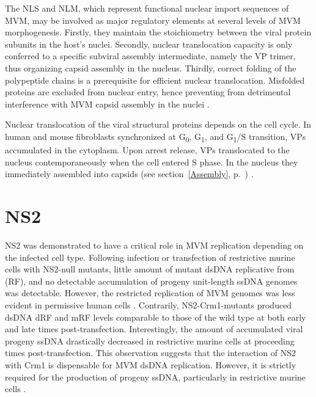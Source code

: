 The NLS and NLM, which represent functional nuclear import sequences of MVM, may be involved as major regulatory elements at several levels of MVM morphogenesis. Firstly, they maintain the stoichiometry between the viral protein subunits in the host's nuclei. Secondly, nuclear translocation capacity is only conferred to a specific subviral assembly intermediate, namely the VP trimer, thus organizing capsid assembly in the nucleus. Thirdly, correct folding of the polypeptide chains is a prerequisite for efficient nuclear translocation. Misfolded proteins are excluded from nuclear entry, hence preventing from detrimental interference with MVM capsid assembly in the nuclei \cite{pmid10729155}.

Nuclear translocation of the viral structural proteins depends on the cell cycle. In human and mouse fibroblasts synchronized at G\textsubscript{0}, G\textsubscript{1}, and G\textsubscript{1}/S transition, VPs accumulated in the cytoplasm. Upon arrest release, VPs translocated to the nucleus contemporaneously when the cell entered S phase. In the nucleus they immediately assembled into capsids (see section~\ref{Assembly}, p.~\pageref{Assembly}) \cite{pmid26067441}.                

 


\section{NS2}
NS2 was demonstrated to have a critical role in MVM replication depending on the infected cell type. Following infection or transfection of restrictive murine cells with NS2-null mutants, little amount of mutant dsDNA replicative from (RF), and no detectable accumulation of progeny unit-length ssDNA genomes was detectable. However, the restricted replication of MVM genomes was less evident in permissive human cells \cite{pmid2147041}. Contrarily, NS2-Crm1-mutants produced dsDNA dRF and mRF levels comparable to those of the wild type at both early and late times post-transfection. Interestingly, the amount of accumulated viral progeny ssDNA drastically decreased in restrictive murine cells at proceeding times post-transfection. This observation suggests that the interaction of NS2 with Crm1 is dispensable for MVM dsDNA replication. However, it is strictly required for the production of progeny ssDNA, particularly in restrictive murine cells \cite{pmid11884550}.  




